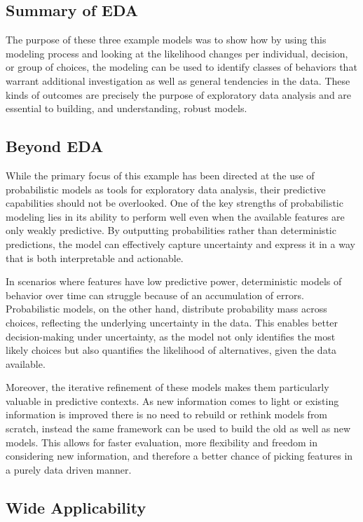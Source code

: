 \documentclass[11pt]{article}
\begin{document}
\subsection*{Summary of EDA}

The purpose of these three example models was to show how by using this modeling process and looking at the likelihood changes per individual, decision, or group of choices, the modeling can be used to identify classes of behaviors that warrant additional investigation as well as general tendencies in the data. These kinds of outcomes are precisely the purpose of exploratory data analysis and are essential to building, and understanding, robust models. 

\subsection*{Beyond EDA}

While the primary focus of this example has been directed at the use of probabilistic models as tools for exploratory data analysis, their predictive capabilities should not be overlooked. One of the key strengths of probabilistic modeling lies in its ability to perform well even when the available features are only weakly predictive. By outputting probabilities rather than deterministic predictions, the model can effectively capture uncertainty and express it in a way that is both interpretable and actionable.

In scenarios where features have low predictive power, deterministic models of behavior over time can struggle because of an accumulation of errors. Probabilistic models, on the other hand, distribute probability mass across choices, reflecting the underlying uncertainty in the data. This enables better decision-making under uncertainty, as the model not only identifies the most likely choices but also quantifies the likelihood of alternatives, given the data available.

Moreover, the iterative refinement of these models makes them particularly valuable in predictive contexts. As new information comes to light or existing information is improved there is no need to rebuild or rethink models from scratch, instead the same framework can be used to build the old as well as new models. This allows for faster evaluation, more flexibility and freedom in considering new information, and therefore a better chance of picking features in a purely data driven manner. 

\subsection*{Wide Applicability}
\end{document}

